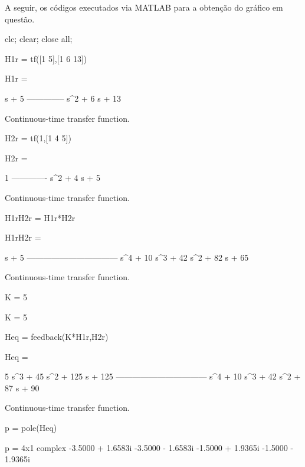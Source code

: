 \documentclass[a4paper, 12pt]{article}
\begin{document}
A seguir, os códigos executados via MATLAB para a obtenção do gráfico em questão.\\

\sloppy
{}
\graphicspath{ {./lista8_images/} }

\begin{matlabcode}
clc; clear; close all;
\end{matlabcode}


\begin{matlabcode}
H1r = tf([1 5],[1 6 13]) 
\end{matlabcode}
\begin{matlaboutput}
H1r =
 
      s + 5
  --------------
  s^2 + 6 s + 13
 
Continuous-time transfer function.
\end{matlaboutput}
\begin{matlabcode}
H2r = tf(1,[1 4 5])
\end{matlabcode}
\begin{matlaboutput}
H2r =
 
        1
  -------------
  s^2 + 4 s + 5
 
Continuous-time transfer function.
\end{matlaboutput}
\begin{matlabcode}

H1rH2r = H1r*H2r
\end{matlabcode}
\begin{matlaboutput}
H1rH2r =
 
                s + 5
  ---------------------------------
  s^4 + 10 s^3 + 42 s^2 + 82 s + 65
 
Continuous-time transfer function.
\end{matlaboutput}


\begin{matlabcode}
K = 5
\end{matlabcode}
\begin{matlaboutput}
K = 5
\end{matlaboutput}
\begin{matlabcode}
Heq = feedback(K*H1r,H2r)
\end{matlabcode}
\begin{matlaboutput}
Heq =
 
    5 s^3 + 45 s^2 + 125 s + 125
  ---------------------------------
  s^4 + 10 s^3 + 42 s^2 + 87 s + 90
 
Continuous-time transfer function.
\end{matlaboutput}
\begin{matlabcode}
p = pole(Heq)
\end{matlabcode}
\begin{matlaboutput}
p = 4x1 complex    
  -3.5000 + 1.6583i
  -3.5000 - 1.6583i
  -1.5000 + 1.9365i
  -1.5000 - 1.9365i

\end{matlaboutput}
\begin{matlabcode}

\end{matlabcode}
\end{document}
